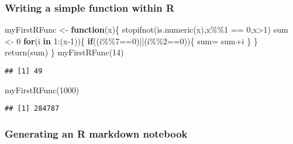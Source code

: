 \documentclass[
]{article}
\newenvironment{Shaded}{\begin{snugshade}}{\end{snugshade}}
\newcommand{\ControlFlowTok}[1]{\textcolor[rgb]{0.13,0.29,0.53}{\textbf{#1}}}
\newcommand{\DecValTok}[1]{\textcolor[rgb]{0.00,0.00,0.81}{#1}}
\newcommand{\FunctionTok}[1]{\textcolor[rgb]{0.00,0.00,0.00}{#1}}
\newcommand{\NormalTok}[1]{#1}
\newcommand{\OtherTok}[1]{\textcolor[rgb]{0.56,0.35,0.01}{#1}}
\newcommand{\SpecialCharTok}[1]{\textcolor[rgb]{0.00,0.00,0.00}{#1}}
\begin{document}
\hypertarget{writing-a-simple-function-within-r}{%
\subsubsection{Writing a simple function within
R}\label{writing-a-simple-function-within-r}}

\begin{Shaded}
\begin{Highlighting}[]
\NormalTok{myFirstRFunc }\OtherTok{\textless{}{-}} \ControlFlowTok{function}\NormalTok{(x)\{}
    \FunctionTok{stopifnot}\NormalTok{(}\FunctionTok{is.numeric}\NormalTok{(x),x}\SpecialCharTok{\%\%}\DecValTok{1} \SpecialCharTok{==} \DecValTok{0}\NormalTok{,x}\SpecialCharTok{\textgreater{}}\DecValTok{1}\NormalTok{)}
\NormalTok{    sum }\OtherTok{\textless{}{-}} \DecValTok{0}
    \ControlFlowTok{for}\NormalTok{(i }\ControlFlowTok{in} \DecValTok{1}\SpecialCharTok{:}\NormalTok{(x}\DecValTok{{-}1}\NormalTok{))\{}
        \ControlFlowTok{if}\NormalTok{((i}\SpecialCharTok{\%\%}\DecValTok{7}\SpecialCharTok{==}\DecValTok{0}\NormalTok{)}\SpecialCharTok{||}\NormalTok{(i}\SpecialCharTok{\%\%}\DecValTok{2}\SpecialCharTok{==}\DecValTok{0}\NormalTok{))\{}
\NormalTok{            sum}\OtherTok{=}\NormalTok{ sum}\SpecialCharTok{+}\NormalTok{i}
\NormalTok{        \}}
\NormalTok{    \}}
    \FunctionTok{return}\NormalTok{(sum)}
\NormalTok{\}}
\FunctionTok{myFirstRFunc}\NormalTok{(}\DecValTok{14}\NormalTok{)}
\end{Highlighting}
\end{Shaded}

\begin{verbatim}
## [1] 49
\end{verbatim}

\begin{Shaded}
\begin{Highlighting}[]
\FunctionTok{myFirstRFunc}\NormalTok{(}\DecValTok{1000}\NormalTok{)}
\end{Highlighting}
\end{Shaded}

\begin{verbatim}
## [1] 284787
\end{verbatim}

\hypertarget{generating-an-r-markdown-notebook}{%
\subsubsection{Generating an R markdown
notebook}\label{generating-an-r-markdown-notebook}}
\end{document}
